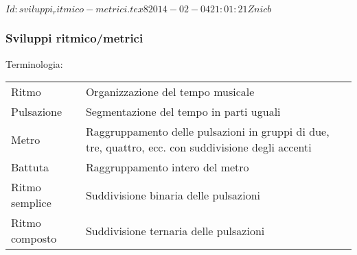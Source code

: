 %
%
\svnInfo $Id: sviluppi_ritmico-metrici.tex 8 2014-02-04 21:01:21Z nicb $

\begin{frame}
    \frametitle{Sviluppi ritmico/metrici}

    Terminologia:
    \begin{tabular}{l p{}}
    Ritmo & Organizzazione del tempo musicale\\
    Pulsazione & Segmentazione del tempo in parti uguali\\
    Metro & Raggruppamento delle pulsazioni in gruppi di due, tre, quattro, ecc.
            con suddivisione degli accenti\\
    Battuta & Raggruppamento intero del metro\\
    Ritmo semplice & Suddivisione binaria delle pulsazioni\\
    Ritmo composto & Suddivisione ternaria delle pulsazioni\\
    \end{tabular}

\end{frame}

